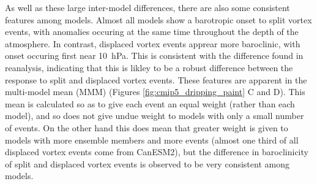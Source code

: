 As well as these large inter-model differences, there are also some consistent
features among models. Almost all models show a barotropic onset to split vortex
events, with anomalies occuring at the same time throughout the depth of the
atmosphere. In contrast, displaced vortex events apprear more baroclinic, with
onset occuring first near 10~hPa. This is consistent with the difference found
in reanalysis, indicating that this is likley to be a robust difference between
the response to split and displaced vortex events. These features are apparent
in the multi-model mean (MMM) (Figures \ref{fig:cmip5_dripping_paint}
C and D). This mean is calculated so as to give each event an equal weight (rather
than each model), and so does not give undue weight to models with only a small
number of events. On the other hand this does mean that greater weight is given
to models with more ensemble members and more events (almost one third of all
displaced vortex events come from CanESM2), but the difference in baroclinicity
of split and displaced vortex events is observed to be very consistent among
models.

